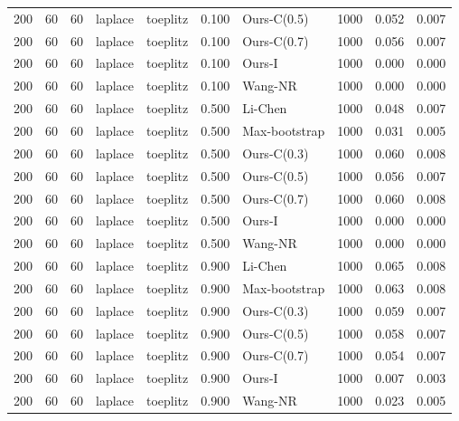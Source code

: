 \begin{tabular}{rrrllrlrrr}
200 & 60 & 60 & laplace & toeplitz & 0.100 & Ours-C(0.5) & 1000 & 0.052 & 0.007 \\
200 & 60 & 60 & laplace & toeplitz & 0.100 & Ours-C(0.7) & 1000 & 0.056 & 0.007 \\
200 & 60 & 60 & laplace & toeplitz & 0.100 & Ours-I & 1000 & 0.000 & 0.000 \\
200 & 60 & 60 & laplace & toeplitz & 0.100 & Wang-NR & 1000 & 0.000 & 0.000 \\
200 & 60 & 60 & laplace & toeplitz & 0.500 & Li-Chen & 1000 & 0.048 & 0.007 \\
200 & 60 & 60 & laplace & toeplitz & 0.500 & Max-bootstrap & 1000 & 0.031 & 0.005 \\
200 & 60 & 60 & laplace & toeplitz & 0.500 & Ours-C(0.3) & 1000 & 0.060 & 0.008 \\
200 & 60 & 60 & laplace & toeplitz & 0.500 & Ours-C(0.5) & 1000 & 0.056 & 0.007 \\
200 & 60 & 60 & laplace & toeplitz & 0.500 & Ours-C(0.7) & 1000 & 0.060 & 0.008 \\
200 & 60 & 60 & laplace & toeplitz & 0.500 & Ours-I & 1000 & 0.000 & 0.000 \\
200 & 60 & 60 & laplace & toeplitz & 0.500 & Wang-NR & 1000 & 0.000 & 0.000 \\
200 & 60 & 60 & laplace & toeplitz & 0.900 & Li-Chen & 1000 & 0.065 & 0.008 \\
200 & 60 & 60 & laplace & toeplitz & 0.900 & Max-bootstrap & 1000 & 0.063 & 0.008 \\
200 & 60 & 60 & laplace & toeplitz & 0.900 & Ours-C(0.3) & 1000 & 0.059 & 0.007 \\
200 & 60 & 60 & laplace & toeplitz & 0.900 & Ours-C(0.5) & 1000 & 0.058 & 0.007 \\
200 & 60 & 60 & laplace & toeplitz & 0.900 & Ours-C(0.7) & 1000 & 0.054 & 0.007 \\
200 & 60 & 60 & laplace & toeplitz & 0.900 & Ours-I & 1000 & 0.007 & 0.003 \\
200 & 60 & 60 & laplace & toeplitz & 0.900 & Wang-NR & 1000 & 0.023 & 0.005 \\
\bottomrule
\end{tabular}
